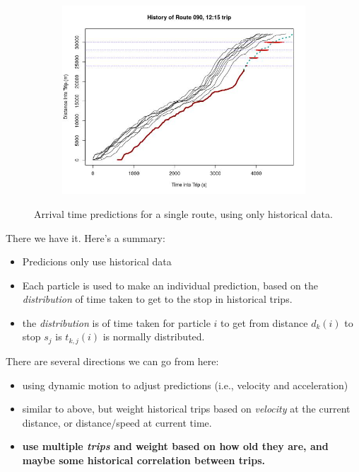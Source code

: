 \documentclass[11pt]{article}\usepackage[]{graphicx}\usepackage[]{color}
\begin{document}
\begin{figure}[bp]
\begin{subfigure}{0.33\textwidth}
    \includegraphics[width=\textwidth]{hist/route090_1215_081.jpg}
    \label{fig:route090-history-3}
  \end{subfigure}
  \caption{Arrival time predictions for a single route, using only historical data.}
  \label{fig:route090-history}
\end{figure}


There we have it. Here's a summary:
\begin{itemize}
\item Predicions only use historical data
\item Each particle is used to make an individual prediction, based on
  the \emph{distribution} of time taken to get to the stop in
  historical trips.
\item the \emph{distribution} is of time taken for particle $i$ to get
  from distance $d_k(i)$ to stop $s_j$ is $t_{k,j}(i)$ is normally distributed.
\end{itemize}



There are several directions we can go from here:
\begin{itemize}
\item using dynamic motion to adjust predictions (i.e., velocity and acceleration)
\item similar to above, but weight historical trips based on
  \emph{velocity} at the current distance, or distance/speed at current time.
\item \textbf{use multiple \emph{trips} and weight based on how old they are,
  and maybe some historical correlation between trips.}
\end{itemize}
\end{document}
